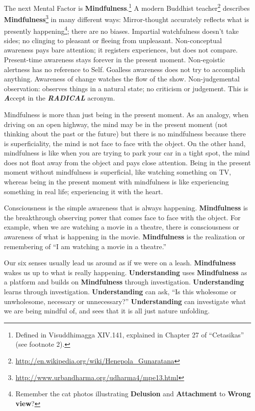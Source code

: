 The next Mental Factor is \textbf{Mindfulness}.\footnote{Defined in Visuddhimagga XIV.141, explained in Chapter 27 of “Cetasikas” (see footnote 2).} A modern Buddhist teacher\footnote{\url{http://en.wikipedia.org/wiki/Henepola_Gunaratana}} describes \textbf{Mindfulness}\footnote{\url{http://www.urbandharma.org/udharma4/mpe13.html}} in many different ways: Mirror-thought accurately reflects what is presently happening\footnote{Remember the cat photos illustrating \textbf{Delusion} and \textbf{Attachment} to \textbf{Wrong view}?}; there are no biases. Impartial watchfulness doesn’t take sides; no clinging to pleasant or fleeing from unpleasant. Non-conceptual awareness pays bare attention; it registers experiences, but does not compare. Present-time awareness stays forever in the present moment. Non-egoistic alertness has no reference to Self. Goalless awareness does not try to accomplish anything. Awareness of change watches the flow of the show. Non-judgemental observation: observes things in a natural state; no criticism or judgement. This is \textbf{\textit{A}}ccept in the \textbf{\textit{RADICAL}} acronym.

Mindfulness is more than just being in the present moment. As an analogy, when driving on an open highway, the mind may be in the present moment (not thinking about the past or the future) but there is no mindfulness because there is superficiality, the mind is not face to face with the object. On the other hand, mindfulness is like when you are trying to park your car in a tight spot, the mind does not float away from the object and pays close attention. Being in the present moment without mindfulness is superficial, like watching something on TV, whereas being in the present moment with mindfulness is like experiencing something in real life; experiencing it with the heart.

Consciousness is the simple awareness that is always happening. \textbf{Mindfulness} is the breakthrough observing power that comes face to face with the object. For example, when we are watching a movie in a theatre, there is consciousness or awareness of what is happening in the movie. \textbf{Mindfulness} is the realization or remembering of “I am watching a movie in a theatre.” 

Our six senses usually lead us around as if we were on a leash. \textbf{Mindfulness} wakes us up to what is really happening. \textbf{Understanding} uses \textbf{Mindfulness} as a platform and builds on \textbf{Mindfulness} through investigation. \textbf{Understanding} learns through investigation. \textbf{Understanding} can ask, “Is this wholesome or unwholesome, necessary or unnecessary?” \textbf{Understanding} can investigate what we are being mindful of, and sees that it is all just nature unfolding.


